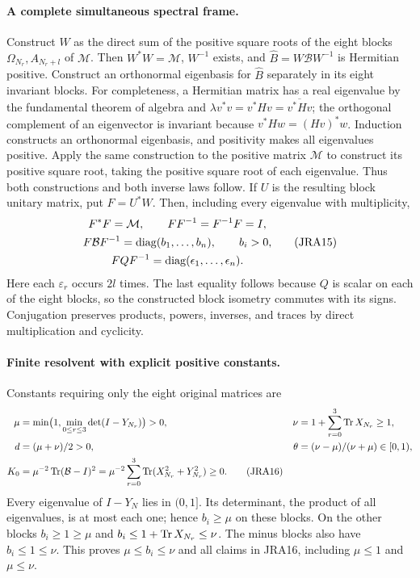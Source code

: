 \paragraph{A complete simultaneous spectral frame.}
Construct $W$ as the direct sum of the positive square roots of the eight
blocks $\Omega_{N_r},A_{N_r+l}$ of $\mathcal M$.
Then $W^*W=\mathcal M$, $W^{-1}$ exists, and
$\widehat B=W\mathcal BW^{-1}$ is Hermitian positive.
Construct an orthonormal eigenbasis for $\widehat B$ separately in its
eight invariant blocks. For completeness, a Hermitian matrix has a
real eigenvalue by the fundamental theorem of algebra and
$\lambda v^*v=v^*Hv=\overline{v^*Hv}$; the orthogonal complement of an
eigenvector is invariant because $v^*Hw=(Hv)^*w$. Induction constructs
an orthonormal eigenbasis, and positivity makes all eigenvalues positive.
Apply the same construction to the positive matrix $\mathcal M$ to
construct its positive square root, taking the positive square root of
each eigenvalue. Thus both constructions and both inverse laws follow.
If $U$ is the resulting block unitary matrix, put $F=U^*W$.
Then, including every eigenvalue with multiplicity,
\begin{equation}
\begin{gathered}
 F^*F=\mathcal M,\qquad FF^{-1}=F^{-1}F=I,\\
 F\mathcal BF^{-1}=\operatorname{diag}(b_1,\ldots,b_n),\qquad b_i>0,\\
 FQF^{-1}=\operatorname{diag}(\epsilon_1,\ldots,\epsilon_n).
\end{gathered}
 \tag{JRA15}
\end{equation}
Here each $\varepsilon_r$ occurs $2l$ times. The last equality follows
because $Q$ is scalar on each of the eight blocks, so the constructed
block isometry commutes with its signs. Conjugation preserves products,
powers, inverses, and traces by direct multiplication and cyclicity.

\paragraph{Finite resolvent with explicit positive constants.}
Constants requiring only the eight original matrices are
\begin{align}
 \mu&=\min\bigl(1,\min_{0\leq r\leq3}\det(I-Y_{N_r})\bigr)>0,
 &\nu&=1+\sum_{r=0}^3\operatorname{Tr} X_{N_r}\geq1,\notag\\
 d&=(\mu+\nu)/2>0,
 &\theta&=(\nu-\mu)/(\nu+\mu)\in[0,1),\notag\\
 K_0&=\mu^{-2}\operatorname{Tr}(\mathcal B-I)^2
 =\mu^{-2}\sum_{r=0}^3\operatorname{Tr}(X_{N_r}^2+Y_{N_r}^2)\geq0.
 \tag{JRA16}
\end{align}
Every eigenvalue of $I-Y_N$ lies in $(0,1]$. Its determinant, the product
of all eigenvalues, is at most each one; hence $b_i\geq\mu$ on these
blocks. On the other blocks $b_i\geq1\geq\mu$ and
$b_i\leq1+\operatorname{Tr} X_{N_r}\leq\nu$. The minus blocks also have
$b_i\leq1\leq\nu$. This proves $\mu\leq b_i\leq\nu$ and all
claims in JRA16, including $\mu\leq1$ and $\mu\leq\nu$.

